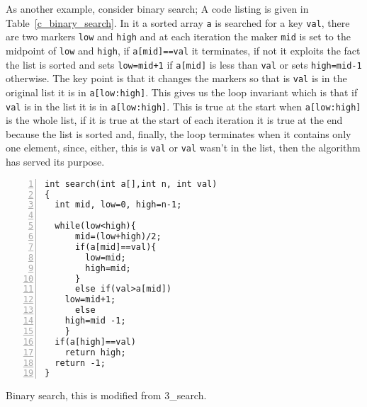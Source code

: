 \documentclass[11pt,a4paper]{scrartcl}
\begin{document}
As another example, consider binary search; A code listing is given in
Table~\ref{c_binary_search}. In it a sorted array \texttt{a} is
searched for a key \texttt{val}, there are two markers \texttt{low}
and \texttt{high} and at each iteration the maker \texttt{mid} is set
to the midpoint of \texttt{low} and \texttt{high}, if
\texttt{a[mid]==val} it terminates, if not it exploits the fact the
list is sorted and sets \texttt{low=mid+1} if \texttt{a[mid]} is less
than \texttt{val} or sets \texttt{high=mid-1} otherwise. The key point
is that it changes the markers so that is \texttt{val} is in the
original list it is in \texttt{a[low:high]}. This gives us the loop
invariant which is that if \texttt{val} is in the list it is in
\texttt{a[low:high]}. This is true at the start when
\texttt{a[low:high]} is the whole list, if it is true at the start of
each iteration it is true at the end because the list is sorted and,
finally, the loop terminates when it contains only one element, since, either,
this is \texttt{val} or \texttt{val} wasn't in the list, then
the algorithm has served its purpose.

\begin{table}
\begin{lstlisting}[numbers=left] 
int search(int a[],int n, int val)
{
  int mid, low=0, high=n-1;

  while(low<high){
      mid=(low+high)/2;
      if(a[mid]==val){
        low=mid;
        high=mid;
      }
      else if(val>a[mid])
	low=mid+1;
      else
	high=mid -1;
    }
  if(a[high]==val)
    return high;
  return -1;
}
\end{lstlisting}
\caption{Binary search, this is modified from 3\_search.\label{c_binary_search}}
\end{table}
\end{document}
